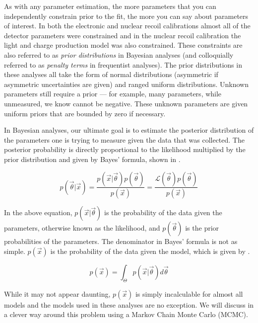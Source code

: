 As with any parameter estimation, the more parameters that you can independently constrain prior to the fit, the more you can say about parameters of interest.  In both the electronic and nuclear recoil calibrations almost all of the detector parameters were constrained and in the nuclear recoil calibration the light and charge production model was also constrained.  These constraints are also referred to as \textit{prior distributions} in Bayesian analyses (and colloquially referred to as \textit{penalty terms} in frequentist analyses).  The prior distributions in these analyses all take the form of normal distributions (asymmetric if asymmetric uncertainties are given) and ranged uniform distributions.  Unknown parameters still require a prior --- for example, many parameters, while unmeasured, we know cannot be negative.  These unknown parameters are given uniform priors that are bounded by zero if necessary.


In Bayesian analyses, our ultimate goal is to estimate the posterior distribution of the parameters one is trying to measure given the data that was collected.  The posterior probability is directly proportional to the likelihood multiplied by the prior distribution and given by Bayes' formula, shown in  \cite{bayes1763essay}.

\begin{equation}
        \label{eqn:xe1t_bayes_formula}
        p(\vec{\theta}|\vec{x}) = \frac{p(\vec{x}|\vec{\theta}) p(\vec{\theta})}{p(\vec{x})} = \frac{\mathcal{L}(\vec{\theta}) p(\vec{\theta})}{p(\vec{x})}
\end{equation}


In the above equation, $p(\vec{x}|\vec{\theta})$ is the probability of the data given the parameters, otherwise known as the likelihood, and $p(\vec{\theta})$ is the prior probabilities of the parameters.  The denominator in Bayes' formula is not as simple.  $p(\vec{x})$ is the probability of the data given the model, which is given by .


\begin{equation}
        \label{eqn:xe1t_px}
        p(\vec{x}) = \int_{\Theta} p(\vec{x}|\vec{\theta}) d\vec{\theta}
\end{equation}


While it may not appear daunting, $p(\vec{x})$ is simply incalculable for almost all models and the models used in these analyses are no exception.  We will discuss in  a clever way around this problem using a Markov Chain Monte Carlo (MCMC).

